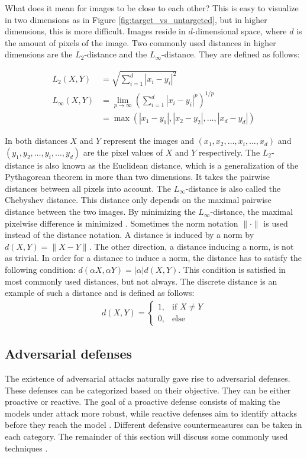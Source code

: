 What does it mean for images to be close to each other? This is easy to visualize in two dimensions as in Figure \ref{fig:target_vs_untargeted}, but in higher dimensions, this is more difficult. Images reside in $d$-dimensional space, where $d$ is the amount of pixels of the image. Two commonly used distances in higher dimensions are the $L_2$-distance and the $L_\infty$-distance. They are defined as follows:

\begin{align*}
L_2(X, Y) &= \sqrt{\sum_{i=1}^d|x_i - y_i|^2} \\
L_\infty(X, Y) &= \lim_{p\rightarrow \infty}\left( \sum_{i=1}^d|x_i-y_i|^p\right)^{1/p} \\
&= \max (|x_1 - y_1|, |x_2-y_2|, \ldots, |x_d-y_d|)
\end{align*}

In both distances $X$ and $Y$ represent the images and $(x_1, x_2, \ldots, x_i, \ldots, x_d)$ and $(y_1, y_2, \ldots, y_i, \ldots, y_d)$ are the pixel values of $X$ and $Y$ respectively. The $L_2$-distance is also known as the Euclidean distance, which is a generalization of the Pythagorean theorem in more than two dimensions. It takes the pairwise distances between all pixels into account. The $L_\infty$-distance is also called the Chebyshev distance. This distance only depends on the maximal pairwise distance between the two images. By minimizing the $L_\infty$-distance, the maximal pixelwise difference is minimized \cite{wiki_distances}.  Sometimes the norm notation $\| \cdot \|$ is used instead of the distance notation. A distance is induced by a norm by $d(X,Y) = \| X -Y\|$. The other direction, a distance inducing a norm, is not as trivial. In order for a distance to induce a norm, the distance has to satisfy the following condition: $d(\alpha X,\alpha Y) = |\alpha | d(X,Y)$. This condition is satisfied in most commonly used distances, but not always. The discrete distance \cite{discrete_distance} is an example of such a distance and is defined as follows:
\begin{align*}
d(X,Y) = 
\begin{cases}
1, &\text{if } X \neq Y\\
0, &\text{else}
\end{cases}
\end{align*}

\subsection{Adversarial defenses}\label{sec:adversarial_defenses}
The existence of adversarial attacks naturally gave rise to adversarial defenses. These defenses can be categorized based on their objective. They can be either proactive or reactive. The goal of a proactive defense consists of making the models under attack more robust, while reactive defenses aim to identify attacks before they reach the model \cite{adversarial_defense_survey}. Different defensive countermeasures can be taken in each category. The remainder of this section will discuss some commonly used techniques \cite{defenses_survey}.\\

